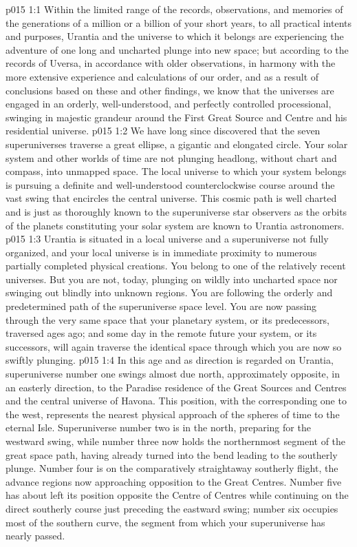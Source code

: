 \vs p015 1:1 Within the limited range of the records, observations, and memories of the generations of a million or a billion of your short years, to all practical intents and purposes, Urantia and the universe to which it belongs are experiencing the adventure of one long and uncharted plunge into new space; but according to the records of Uversa, in accordance with older observations, in harmony with the more extensive experience and calculations of our order, and as a result of conclusions based on these and other findings, we know that the universes are engaged in an orderly, well\hyp{}understood, and perfectly controlled processional, swinging in majestic grandeur around the First Great Source and Centre and his residential universe.
\vs p015 1:2 We have long since discovered that the seven superuniverses traverse a great ellipse, a gigantic and elongated circle. Your solar system and other worlds of time are not plunging headlong, without chart and compass, into unmapped space. The local universe to which your system belongs is pursuing a definite and well\hyp{}understood counterclockwise course around the vast swing that encircles the central universe. This cosmic path is well charted and is just as thoroughly known to the superuniverse star observers as the orbits of the planets constituting your solar system are known to Urantia astronomers.
\vs p015 1:3 Urantia is situated in a local universe and a superuniverse not fully organized, and your local universe is in immediate proximity to numerous partially completed physical creations. You belong to one of the relatively recent universes. But you are not, today, plunging on wildly into uncharted space nor swinging out blindly into unknown regions. You are following the orderly and predetermined path of the superuniverse space level. You are now passing through the very same space that your planetary system, or its predecessors, traversed ages ago; and some day in the remote future your system, or its successors, will again traverse the identical space through which you are now so swiftly plunging.
\vs p015 1:4 \pc In this age and as direction is regarded on Urantia, superuniverse number one swings almost due north, approximately opposite, in an easterly direction, to the Paradise residence of the Great Sources and Centres and the central universe of Havona. This position, with the corresponding one to the west, represents the nearest physical approach of the spheres of time to the eternal Isle. Superuniverse number two is in the north, preparing for the westward swing, while number three now holds the northernmost segment of the great space path, having already turned into the bend leading to the southerly plunge. Number four is on the comparatively straightaway southerly flight, the advance regions now approaching opposition to the Great Centres. Number five has about left its position opposite the Centre of Centres while continuing on the direct southerly course just preceding the eastward swing; number six occupies most of the southern curve, the segment from which your superuniverse has nearly passed.
